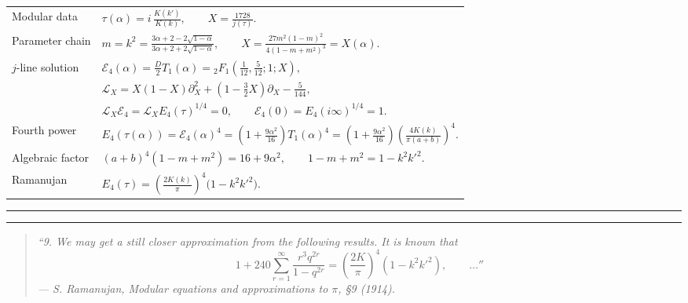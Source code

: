 \documentclass[9pt]{extarticle}
\newcommand{\DoubleRule}{\par\vspace{3pt}\hrule height 0.65pt\vspace{1.3pt}\hrule height 0.28pt\vspace{5.2pt}}
\begin{document}
{\fontsize{8.85}{12.55}\selectfont
\renewcommand{\arraystretch}{1.28}
\begin{tabularx}{\textwidth}{@{}J@{\hspace{0.10in}}Y@{}}
Modular data &
$\displaystyle
\tau(\alpha)=i\,\frac{K(k')}{K(k)},
\qquad X=\frac{1728}{j(\tau)}.$ \\[8pt]

Parameter chain &
$\displaystyle
m=k^2=\frac{3\alpha+2-2\sqrt{1-\alpha}}{3\alpha+2+2\sqrt{1-\alpha}},
\qquad
X=\frac{27m^2(1-m)^2}{4(1-m+m^2)^3}=X(\alpha).$ \\[9pt]

$j$-line solution &
$\displaystyle
\mathcal E_4(\alpha)=\frac D2T_1(\alpha)
={}_2F_1\!\left(\frac1{12},\frac5{12};1;X\right),$ \\[5pt]
& $\displaystyle
\mathcal L_X=X(1-X)\partial_X^2+\left(1-\frac32X\right)\partial_X-\frac5{144},$ \\[4pt]
& $\displaystyle
\mathcal L_X\mathcal E_4=\mathcal L_X E_4(\tau)^{1/4}=0,
\qquad \mathcal E_4(0)=E_4(i\infty)^{1/4}=1.$ \\[8pt]

Fourth power &
$\displaystyle
E_4(\tau(\alpha))
=\mathcal E_4(\alpha)^4
=\left(1+\frac{9\alpha^2}{16}\right)T_1(\alpha)^4
=\left(1+\frac{9\alpha^2}{16}\right)\left(\frac{4K(k)}{\pi(a+b)}\right)^4.$ \\[8pt]

Algebraic factor &
$\displaystyle
(a+b)^4(1-m+m^2)=16+9\alpha^2,
\qquad
1-m+m^2=1-k^2{k'}^2.$ \\[8pt]

Ramanujan &
$\displaystyle
E_4(\tau)=\left(\frac{2K(k)}{\pi}\right)^4
\bigl(1-k^2{k'}^2\bigr).$ \\[7pt]

\end{tabularx}
}

\DoubleRule

{\fontsize{8.45}{11.65}\selectfont
\begin{quote}
\itshape
``9. We may get a still closer approximation from the following results.
It is known that
\vspace{2pt}
\[
1+240\sum_{r=1}^{\infty}\frac{r^3q^{2r}}{1-q^{2r}}
=\left(\frac{2K}{\pi}\right)^4\!\left(1-k^2{k'}^2\right),
\qquad \ldots''
\]
\normalfont\hfill --- S. Ramanujan, \emph{Modular equations and approximations to $\pi$}, \S9 (1914).
\end{quote}
}
\end{document}
